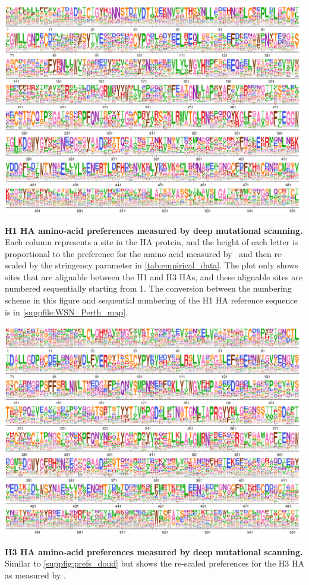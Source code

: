 \documentclass[11pt]{article}
\begin{document}
\begin{suppfig}[H]
\centerline{\includegraphics[width=\textwidth]{suppfig1.pdf}}
\caption{\label{suppfig:prefs_doud}
\textbf{H1 HA amino-acid preferences measured by deep mutational scanning.}
Each column represents a site in the HA protein, and the height of each letter is proportional to the preference for the amino acid measured by~\citet{doud2016accurate} and then re-scaled by the stringency parameter in \ref{tab:empirical_data}. 
The plot only shows sites that are alignable between the H1 and H3 HAs, and these alignable sites are numbered sequentially starting from 1.
The conversion between the numbering scheme in this figure and sequential numbering of the H1 HA reference sequence is in \ref{suppfile:WSN_Perth_map}. 
}
\end{suppfig}
\clearpage 


\begin{suppfig}[H]
\centerline{\includegraphics[width=\textwidth]{suppfig2.pdf}}
\caption{\label{suppfig:prefs_lee}
\textbf{H3 HA amino-acid preferences measured by deep mutational scanning.}
Similar to \ref{suppfig:prefs_doud} but shows the re-scaled preferences for the H3 HA as measured by \citet{lee2018deep}.
 }
\end{suppfig}
\clearpage 
\end{document}
